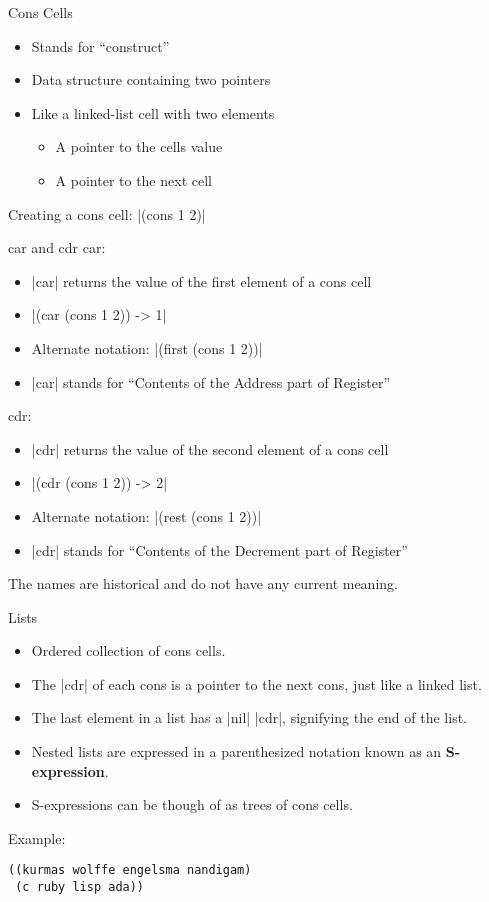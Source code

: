 \documentclass{beamer}
\begin{document}

\begin{frame}{Cons Cells}
  \begin{itemize}
  \item Stands for ``construct''
  \item Data structure containing two pointers
  \item Like a linked-list cell with two elements
    \begin{itemize}
    \item A pointer to the cells value
    \item A pointer to the next cell
    \end{itemize}
  \end{itemize}

  Creating a cons cell: \cl|(cons 1 2)|
\end{frame}

\begin{frame}{car and cdr}
  car:
  \begin{itemize}
  \item \cl|car| returns the value of the first element of a cons cell
  \item \cl|(car (cons 1 2)) -> 1|
  \item Alternate notation: \cl|(first (cons 1 2))|
  \item \cl|car| stands for ``Contents of the Address part of Register''
  \end{itemize}
  cdr:
  \begin{itemize}
  \item \cl|cdr| returns the value of the second element of a cons cell
  \item \cl|(cdr (cons 1 2)) -> 2|
  \item Alternate notation: \cl|(rest (cons 1 2))|
  \item \cl|cdr| stands for ``Contents of the Decrement part of Register''
  \end{itemize}
  The names are historical and do not have any current meaning.
\end{frame}

\begin{frame}[fragile]{Lists}
\begin{itemize}
\item Ordered collection of cons cells.
\item The \cl|cdr| of each cons is a pointer to the next cons, just like a linked list.
\item The last element in a list has a \cl|nil| \cl|cdr|, signifying the end of the list.
\item Nested lists are expressed in a parenthesized notation known as an \textbf{S-expression}.
\item S-expressions can be though of as trees of cons cells.
\end{itemize}
Example:
\begin{verbatim}
((kurmas wolffe engelsma nandigam)
 (c ruby lisp ada))
\end{verbatim}
\end{frame}
\end{document}
